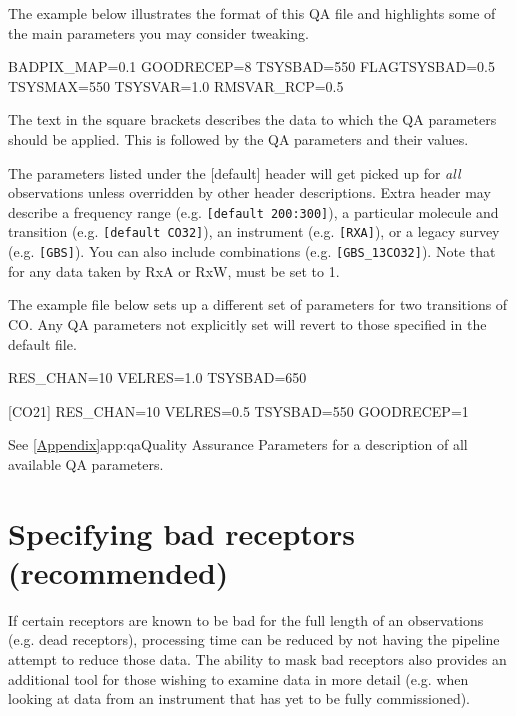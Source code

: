 \documentclass[11pt,oneside,chapters]{starlink}
\begin{document}
The example below illustrates the format of this QA file and
highlights some of the main parameters you may consider tweaking.

\vspace{0.2cm}
\begin{terminalv}
[default]
BADPIX_MAP=0.1
GOODRECEP=8
TSYSBAD=550
FLAGTSYSBAD=0.5
TSYSMAX=550
TSYSVAR=1.0
RMSVAR_RCP=0.5
\end{terminalv}
The text in the square brackets describes the data to which the QA
parameters should be applied. This is followed by the QA parameters
and their values.

The parameters listed under the [default] header will get picked up
for \textit{all} observations unless overridden by other header
descriptions. Extra header may describe a frequency range (e.g.
\texttt{[default 200:300]}), a particular molecule and transition
(e.g. \texttt{[default CO32]}), an instrument (e.g. \texttt{[RXA]}),
or a legacy survey (e.g. \texttt{[GBS]}). You can also include
combinations (e.g. \texttt{[GBS\_13CO32]}). Note that for any data
taken by RxA or RxW,  must be set to 1.

The example file below sets up a different set of parameters for two
transitions of CO. Any QA parameters not explicitly set will revert to
those specified in the default  file.

\vspace{0.2cm}
\begin{terminalv}
[C18O32]
RES_CHAN=10
VELRES=1.0
TSYSBAD=650

[CO21]
RES_CHAN=10
VELRES=0.5
TSYSBAD=550
GOODRECEP=1
\end{terminalv}

See \cref{Appendix}{app:qa}{Quality Assurance Parameters} for a
description of all available QA parameters.


\section{Specifying bad receptors (recommended)}
\label{sec:badrec}

If certain receptors are known to be bad for the full length of an
observations (e.g. dead receptors), processing time can be reduced by
not having the pipeline attempt to reduce those data. The ability to
mask bad receptors also provides an additional tool for those wishing
to examine data in more detail (e.g. when looking at data from an
instrument that has yet to be fully commissioned).
\end{document}
